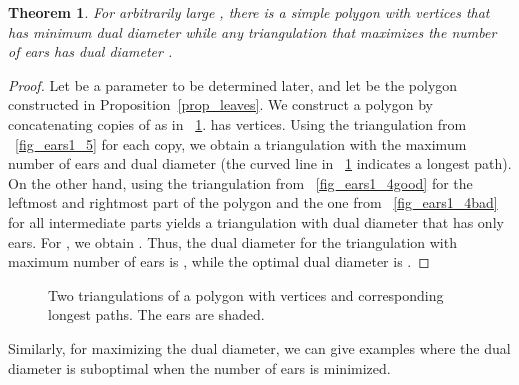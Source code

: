 \documentclass{article}
\newtheorem{theorem}{Theorem}[section]
\begin{document}
\begin{theorem}\label{thm_leaves}
For arbitrarily large , there 
is a simple polygon with  vertices that has minimum dual diameter
 while any triangulation
that maximizes the number of 
ears has dual diameter . 
\end{theorem}
\begin{proof}
Let  be a parameter to be determined later, and
let  be the polygon constructed in Proposition~\ref{prop_leaves}. 
We construct a polygon  by concatenating  copies of  
as in \figurename~\ref{fig_ears2}.
 has  vertices.
Using the triangulation from \figurename~\ref{fig_ears1_5} for each copy,
we obtain a triangulation with the maximum number  of ears and dual 
diameter  (the curved line in \figurename~\ref{fig_ears2} 
indicates a longest path).
On the other hand, using the triangulation from 
\figurename~\ref{fig_ears1_4good} for the leftmost and rightmost part of 
the polygon and the one from \figurename~\ref{fig_ears1_4bad} for all 
intermediate parts yields a triangulation with dual diameter  
that has only  ears.
For , we obtain .
Thus, the dual diameter for the triangulation with maximum number of ears 
is , while the optimal dual diameter is .
\end{proof}

\begin{figure}[htb]
\centering
{} \hspace{0.5cm} 
\caption{Two triangulations of a polygon with  vertices  
and corresponding longest paths. 
The ears are shaded.}
\label{fig_ears2}
\end{figure}

Similarly, for maximizing the dual diameter, we can give examples 
where the dual diameter is suboptimal when the number of ears is minimized.
\end{document}
